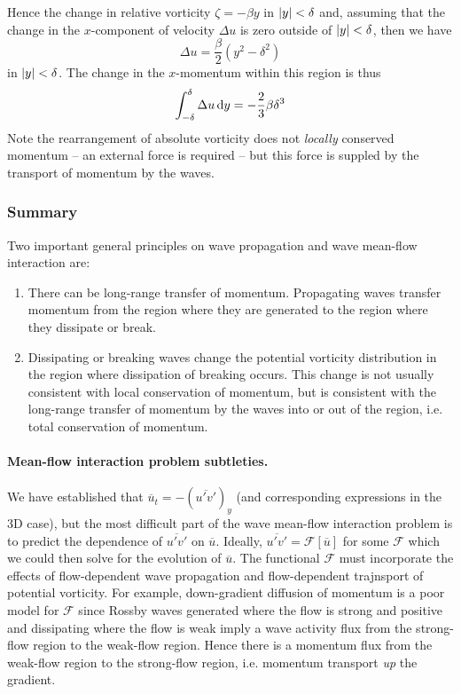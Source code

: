 \documentclass{jknotes}
\begin{document}
Hence the change in relative vorticity $\zeta = -\beta y$ in $\abs{y} <
\delta$ and, assuming that the change in the $x$-component of velocity $\Delta
u$ is zero outside of $\abs{y} < \delta$, then we have
\begin{equation}
	\Delta u = \frac{\beta}{2}(y^2-\delta^2)
\end{equation}
in $\abs{y} < \delta$. The change in the $x$-momentum within this region is
thus
\begin{equation}
	\int_{-\delta}^\delta \Delta u \, \diffd y = -\frac{2}{3}\beta \delta^3
\end{equation}
Note the rearrangement of absolute vorticity does not \emph{locally} conserved
momentum -- an external force is required -- but this force is suppled by the
transport of momentum by the waves.

\subsubsection{Summary}
Two important general principles on wave propagation and wave mean-flow
interaction are:
\begin{enumerate}
	\item There can be long-range transfer of momentum. Propagating waves
		transfer momentum from the region where they are generated to the
		region where they dissipate or break.
	\item Dissipating or breaking waves change the potential vorticity
		distribution in the region where dissipation of breaking occurs. This
		change is not usually consistent with local conservation of momentum,
		but is consistent with the long-range transfer of momentum by the
		waves into or out of the region, i.e. total conservation of momentum.
\end{enumerate}

\paragraph{Mean-flow interaction problem subtleties.}
We have established that $\overline{u}_t = -(\overline{u'v'})_y$ (and
corresponding expressions in the 3D case), but the most difficult part of the
wave mean-flow interaction problem is to predict the dependence of
$\overline{u'v'}$ on $\overline{u}$. Ideally, $\overline{u'v'} =
\mathcal{F}\!\left[\overline{u}\right]$ for some $\mathcal{F}$ which we could
then solve for the evolution of $\overline{u}$. The functional $\mathcal{F}$
must incorporate the effects of flow-dependent wave propagation and
flow-dependent trajnsport of potential vorticity. For example, down-gradient
diffusion of momentum is a poor model for $\mathcal{F}$ since Rossby waves
generated where the flow is strong and positive and dissipating where the flow
is weak imply a wave activity flux from the strong-flow region to the
weak-flow region. Hence there is a momentum flux from the weak-flow region to
the strong-flow region, i.e. momentum transport \emph{up} the gradient. 
\end{document}
